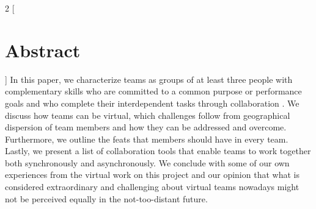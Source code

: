 \begin{multicols}{2}
[\section{Abstract}]
In this paper, we characterize teams as groups of at least three people with complementary skills who are committed to a 
common purpose or performance goals and who complete their interdependent tasks through collaboration \cite{katzenbach2003the}. We discuss how 
teams can be virtual, which challenges follow from geographical dispersion of team members and how they can be addressed and overcome. Furthermore, we outline the feats that members should have in every team. Lastly, we present a list of collaboration tools that enable teams to work together both synchronously and asynchronously. We conclude with some of our own experiences from the virtual work on this project and our opinion that what is considered extraordinary and challenging about virtual teams nowadays might not be perceived equally in the not-too-distant future.
\end{multicols}